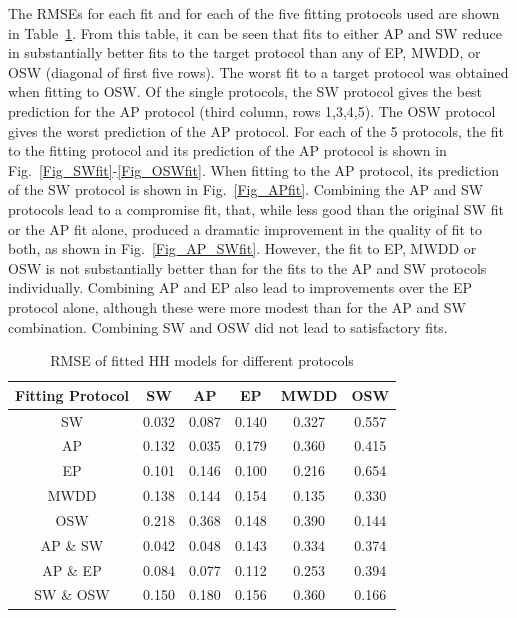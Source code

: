 \documentclass[11pt,a4paper,oneside]{article}
\begin{document}
The RMSEs for each fit and for each of the five fitting protocols used are shown in Table~\ref{Tab_MSE_Fitted}. From this table, it can be seen that fits to either AP and SW reduce in substantially better fits to the target protocol than any of EP, MWDD, or OSW (diagonal of first five rows). The worst fit to a target protocol was obtained when fitting to OSW. Of the single protocols, the SW protocol gives the best prediction for the AP protocol (third column, rows 1,3,4,5). The OSW protocol gives the worst prediction of the AP protocol. For each of the 5 protocols, the fit to the fitting protocol and its prediction of the AP protocol is shown in Fig.~\ref{Fig_SWfit}-\ref{Fig_OSWfit}. When fitting to the AP protocol, its prediction of the SW protocol is shown in Fig.~\ref{Fig_APfit}. Combining the AP and SW protocols lead to a compromise fit, that, while less good than the original SW fit or the AP fit alone, produced a dramatic improvement in the quality of fit to both, as shown in Fig.~\ref{Fig_AP_SWfit}. However, the fit to EP, MWDD or OSW is not substantially better than for the fits to the AP and SW protocols individually. Combining AP and EP also lead to improvements over the EP protocol alone, although these were more modest than for the AP and SW combination. Combining SW and OSW did not lead to satisfactory fits.

\begin{table}
\caption{RMSE of fitted HH models for different protocols}
\centering
\begin{tabular}{|c|c|c|c|c|c|}
\hline 
 Fitting Protocol & SW & AP & EP & MWDD & OSW \\ [0.5ex]
\hline 
\hline
SW \cite{Beattie2018} & 0.032 & 0.087 & 0.140 & 0.327 & 0.557 
 \\
\hline 
AP & 0.132 & 0.035 & 0.179 & 0.360 & 0.415  \\ 
\hline 
EP & 0.101 & 0.146 & 0.100 & 0.216 & 0.654  \\ 
\hline 
MWDD & 0.138 & 0.144 & 0.154 & 0.135 & 0.330 
\\ 
\hline 
OSW & 0.218 & 0.368 & 0.148 & 0.390 & 0.144 
 \\ 
\hline 
AP \& SW & 0.042 & 0.048 & 0.143 & 0.334 & 0.374 
 \\
\hline 
AP \& EP & 0.084 & 0.077 & 0.112 & 0.253 & 0.394 
 \\
\hline
SW \& OSW & 0.150 & 0.180 & 0.156 & 0.360 & 0.166 
 \\
\hline
\end{tabular} 
\label{Tab_MSE_Fitted}
\end{table}
\end{document}
